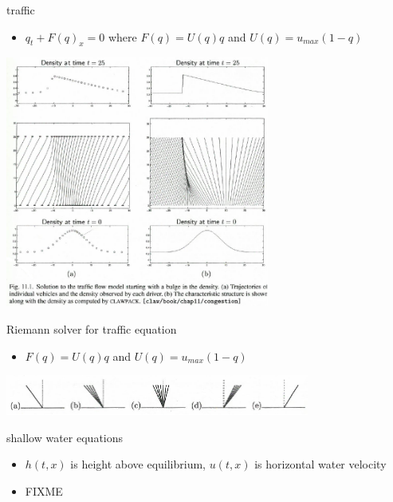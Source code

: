 \documentclass[10pt,hyperref]{beamer}
\begin{document}
\begin{frame}{traffic}

\begin{itemize}
\item $q_t + F(q)_x = 0$ where $F(q) = U(q) q$ and $U(q) = u_{max} (1-q)$
\end{itemize}

\hfill \includegraphics[width=0.65\textwidth]{figs/leveque11p1}
\end{frame}

\begin{frame}{Riemann solver for traffic equation}

\begin{itemize}
\item $F(q) = U(q) q$ and $U(q) = u_{max} (1-q)$
\end{itemize}

\hfill \includegraphics[width=0.75\textwidth]{figs/leveque12p1}
\end{frame}


\begin{frame}{shallow water equations}

\begin{itemize}
\item $h(t,x)$ is height above equilibrium, $u(t,x)$ is horizontal water velocity
\item FIXME
\end{itemize}
\end{frame}
\end{document}
